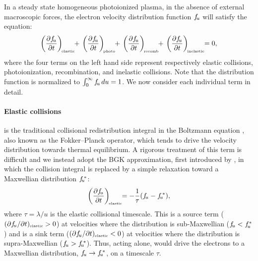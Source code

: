 \documentclass{emulateapj}
\begin{document}
In a steady state homogeneous photoionized plasma, in the absence of
external macroscopic forces, the electron velocity distribution
function \(f_{\!u}\) will satisfy the equation:
\begin{equation}
  \label{eq:1}
  \Dfudt{elastic} \!\!+\, \Dfudt{photo} \!\!+\, \Dfudt{recomb} \!\!+\, \Dfudt{inelastic} \!\!= 0, 
\end{equation}
where the four terms on the left hand side represent respectively
elastic collisions, photoionization, recombination, and inelastic
collisions.  Note that the distribution function is normalized to
\(\int_0^\infty f_{\!u}\, du = 1\).  We now consider each individual term in detail.

\newcommand\fustar{\ensuremath{\fu\smash{\!^*}}}
\paragraph{Elastic collisions}  is the traditional
collisional redistribution integral in the Boltzmann equation
\citep[e.g.,][]{Pitaevskii:1981a}, also known as the Fokker--Planck
operator, which tends to drive the velocity distribution towards
thermal equilibrium.  A rigorous treatment of this term is difficult
and we instead adopt the BGK approximation, first introduced by
\citet{Bhatnagar:1954a}, in which the collision integral is replaced
by a simple relaxation toward a Maxwellian distribution \(\fustar\):
\begin{equation}
  \label{eq:2}
  \Dfudt{elastic} \!\!= -\frac{1}{\tau} (\fu - \fustar) ,
\end{equation}
where \(\tau = \lambda/u\) is the elastic collisional timescale. 
This is a source term (\((\partial f_{\!u}/\partial t)_{\scriptscriptstyle\mathrm{elastic}} > 0\)) at velocities where
the distribution is sub-Maxwellian (\(f_{\!u} < f_{\!u}^*\)) and is a sink
term (\((\partial f_{\!u}/\partial t)_{\scriptscriptstyle\mathrm{elastic}} < 0\)) at velocities where the distribution
is supra-Maxwellian (\(\fu > \fustar\)).  Thus, acting alone,
 would drive the electrons to a Maxwellian
distribution, \(\fu \to \fustar\), on a timescale \(\tau\). 
\end{document}
